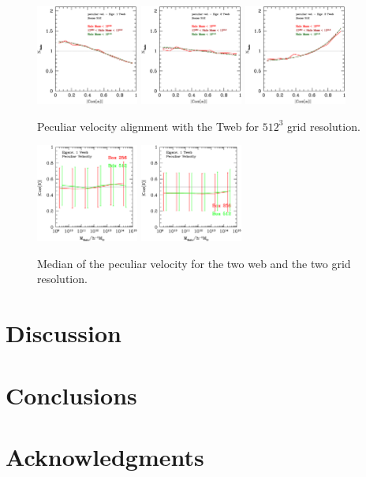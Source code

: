 \documentclass[usenatbib]{mn2e}
\begin{document}
\begin{figure}
\includegraphics[width=0.30\textwidth]{../plot2/Vel/512_vel_T1.ps}
\includegraphics[width=0.30\textwidth]{../plot2/Vel/512_vel_T2.ps}
\includegraphics[width=0.30\textwidth]{../plot2/Vel/512_vel_T3.ps}
\caption{Peculiar velocity alignment with the Tweb for $512^3$ grid resolution.}
\end{figure}
\begin{figure}
\includegraphics[width=0.30\textwidth]{../plot2/Mass/vVWeb.ps}
\includegraphics[width=0.30\textwidth]{../plot2/Mass/vTWeb.ps}
\caption{Median of the peculiar velocity for the two web  and the two grid resolution.}
\end{figure}


\section{Discussion}
\label{sec:discussion}


\section{Conclusions}
\label{sec:conclusions}


\section*{Acknowledgments} 


 
\end{document}
